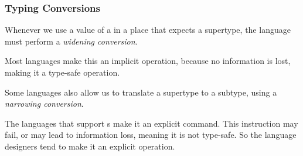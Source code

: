 \subsubsection{Typing Conversions}\label{subsubsec:Typing_Conversions}
\begin{definition}\label{def:Widening_Conversion}
  Whenever we use a value of a  in a place that expects a supertype, the language must perform a \emph{widening conversion}.

  \begin{remark}[Implicit]\label{rmk:Widening_Conversion_Implicit}
    Most languages make this an implicit operation, because no information is lost, making it a type-safe operation.
  \end{remark}
\end{definition}

\begin{definition}\label{def:Narrowing_Conversion}
  Some languages also allow us to translate a supertype to a subtype, using a \emph{narrowing conversion}.

  \begin{remark}[Explicit]\label{rmk:Narrowing_Conversion_Explicit}
    The languages that support s make it an explicit command.
    This instruction may fail, or may lead to information loss, meaning it is not type-safe.
    So the language designers tend to make it an explicit operation.
  \end{remark}
\end{definition}



